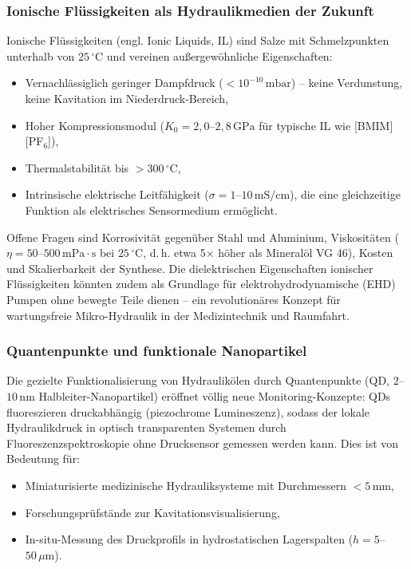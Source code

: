 ﻿\documentclass[a4paper,12pt]{scrreprt}
\theoremstyle{definition}
\begin{document}
\subsubsection{Ionische Flüssigkeiten als Hydraulikmedien der Zukunft}

Ionische Flüssigkeiten (engl. Ionic Liquids, IL) sind Salze mit
Schmelzpunkten unterhalb von $25\,{^\circ}\mathrm{C}$ und vereinen
außergewöhnliche Eigenschaften:
\begin{itemize}
  \item Vernachlässiglich geringer Dampfdruck
    ($< 10^{-10}\,\mathrm{mbar}$) -- keine Verdunstung, keine Kavitation
    im Niederdruck-Bereich,
  \item Hoher Kompressionsmodul ($K_0 = 2{,}0$--$2{,}8\,\mathrm{GPa}$
    für typische IL wie [BMIM][PF$_6$]),
  \item Thermal\-stabilität bis $> 300\,{^\circ}\mathrm{C}$,
  \item Intrinsische elektrische Leitfähigkeit ($\sigma = 1$--$10\,\mathrm{mS/cm}$),
    die eine gleichzeitige Funktion als elektrisches Sensor\-medium ermöglicht.
\end{itemize}
Offene Fragen sind Korrosivität gegenüber Stahl und Aluminium,
Viskositäten ($\eta = 50$--$500\,\mathrm{mPa\cdot s}$ bei $25\,{^\circ}\mathrm{C}$,
d.\,h. etwa 5$\times$ höher als Mineralöl VG 46), Kosten und
Skalierbarkeit der Synthese. Die dielektrischen Eigenschaften ionischer
Flüssigkeiten könnten zudem als Grundlage für elektrohydrodynamische
(EHD) Pumpen ohne bewegte Teile dienen -- ein revolutionäres Konzept
für wartungsfreie Mikro-Hydraulik in der Medizintechnik und Raumfahrt.

\subsubsection{Quantenpunkte und funktionale Nanopartikel}

Die gezielte Funktionalisierung von Hydraulikölen durch Quantenpunkte
(QD, $2$--$10\,\mathrm{nm}$ Halbleiter-Nanopartikel) eröffnet
völlig neue Monitoring-Konzepte: QDs fluoreszieren druckabhängig
(piezochrome Lumineszenz), sodass der lokale Hydraulikdruck in
optisch transparenten Systemen durch Fluoreszenz\-spektroskopie
ohne Drucksensor gemessen werden kann. Dies ist von Bedeutung für:
\begin{itemize}
  \item Miniaturisierte medizinische Hydrauliksysteme mit
    Durchmessern $< 5\,\mathrm{mm}$,
  \item Forschungsprüfstände zur Kavitationsvisualisierung,
  \item In-situ-Messung des Druckprofils in hydrostatischen Lagerspalten
    ($h = 5$--$50\,\mu\mathrm{m}$).
\end{itemize}
\end{document}
